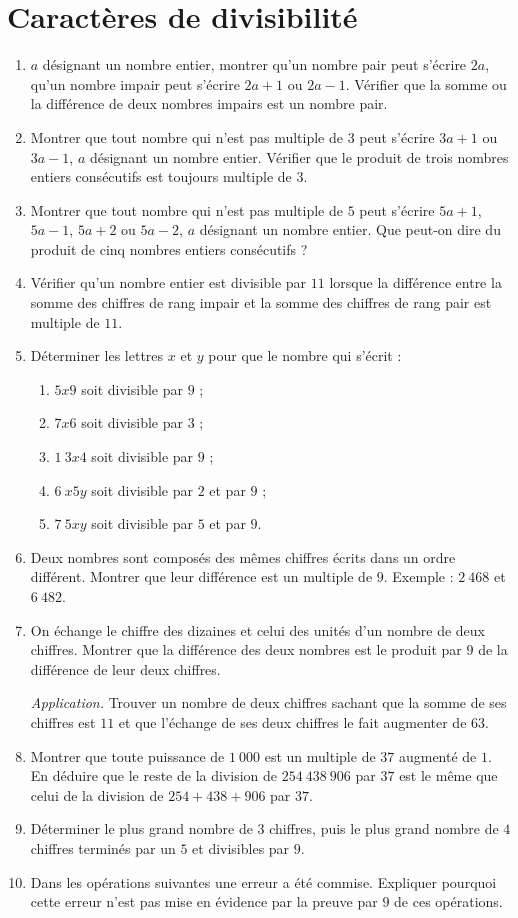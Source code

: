 
 
 \chapter{Caractères de divisibilité}
 
\begin{enumerate}
\item  $a$ désignant un nombre entier, montrer qu'un nombre pair peut s'écrire $2a$, qu'un nombre impair peut s'écrire $2a+1$ ou $2a-1$. Vérifier que la somme ou la différence de deux nombres impairs est un nombre pair.  
\item Montrer que tout nombre qui n'est pas multiple de $3$ peut s'écrire $3a+1$ ou $3a-1$, $a$ désignant un nombre entier.
Vérifier que le produit de trois nombres entiers consécutifs est toujours multiple de $3$. 
\item Montrer que tout nombre qui n'est pas multiple de $5$ peut s'écrire $5a+1$, $5a-1$, $5a+2$ ou $5a-2$, $a$ désignant un nombre entier. Que peut-on dire du produit de cinq nombres entiers consécutifs ? 
\item Vérifier qu'un nombre entier est divisible par $11$ lorsque la différence entre la somme des chiffres
de rang impair et la somme des chiffres de rang pair 
est multiple de $11$. 
\item Déterminer les lettres $x$ et $y$ pour que le nombre qui s'écrit : 
\begin{enumerate}
\item $5x9$ soit divisible par $9$ ; 
\item $7x6$ soit divisible par $3$ ; 
\item $1~3x4$ soit divisible par $9$ ; 
\item $6~x5y$ soit divisible par $2$ et par $9$ ; 
\item $7~5xy$ soit divisible par $5$ et par $9$. 
\end{enumerate}
\item Deux nombres sont composés des mêmes chiffres écrits dans un ordre différent. Montrer que leur différence est un multiple de $9$. Exemple : $2~468$
et $6~482$. 
\item On échange le chiffre des dizaines et celui des unités d'un nombre de deux chiffres. Montrer que la différence des deux nombres est le produit par $9$
de la différence de leur deux chiffres. 

\emph{Application.} Trouver un nombre de deux chiffres sachant que la somme de ses chiffres est $11$ et que l'échange de ses deux chiffres le fait augmenter de $63$. 
\item Montrer que toute puissance de $1~000$ est un 
multiple de $37$ augmenté de $1$. En déduire que le reste de la division de $254~438~906$ par $37$ est le même que celui de la division de $254+438+906$ par $37$. 
\item Déterminer le plus grand nombre de $3$ chiffres, puis le plus grand nombre de $4$ chiffres terminés par 
un $5$ et divisibles par $9$. 
\item Dans les opérations suivantes une erreur a été
commise. Expliquer pourquoi cette erreur n'est pas 
mise en évidence par la preuve par $9$ de ces opérations.


\end{enumerate}
